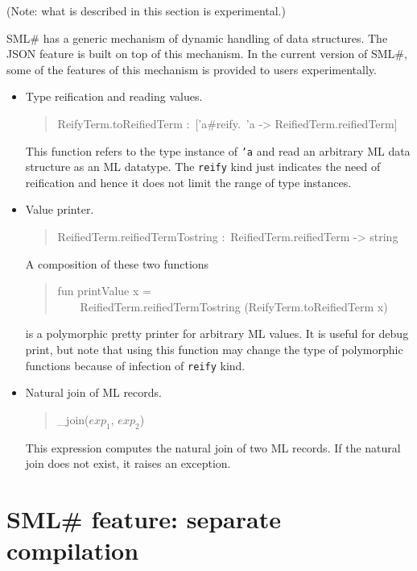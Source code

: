 \documentclass{jbook}
\newcommand{\txt}[2]{#2}
\newcommand{\smlsharp}{SML\#}
\newenvironment{program}{\begin{quote}\begin{tt}}%
                        {\end{tt}\end{quote}}
\begin{document}
\else%
	(Note: what is described in this section is experimental.)

	\smlsharp{} has
a generic mechanism of dynamic handling of data structures.
	The JSON feature is built on top of this mechanism.
	In the current version of \smlsharp{},
some of the features of this mechanism is provided to users
experimentally.

\begin{itemize}
\item
	Type reification and reading values.
\begin{program}
ReifyTerm.toReifiedTerm :\ ['a\#reify.\ 'a -> ReifiedTerm.reifiedTerm]
\end{program}
	This function refers to the type instance of {\tt 'a}
and read an arbitrary ML data structure as an ML datatype.
	The {\tt reify} kind just indicates the need of reification
and hence it does not limit the range of type instances.

\item
	Value printer.
\begin{program}
ReifiedTerm.reifiedTermTostring :\ ReifiedTerm.reifiedTerm -> string
\end{program}

	A composition of these two functions
\begin{program}
fun printValue x =\\
\ \ \ \ ReifiedTerm.reifiedTermTostring (ReifyTerm.toReifiedTerm x)
\end{program}
is a polymorphic pretty printer for arbitrary ML values.
	It is useful for debug print,
but note that
using this function may change the type of polymorphic functions
because of infection of {\tt reify} kind.

\item
        Natural join of ML records.
\begin{program}
\_join($\mathit{exp}_1$, $\mathit{exp}_2$)
\end{program}
	This expression
computes the natural join of two ML records.
	If the natural join does not exist, it raises an exception.

\end{itemize}


\fi%


\chapter{
\txt{\smlsharp{}の拡張機能：\smlsharp{}分割コンパイルシステム}
    {\smlsharp{} feature: separate compilation}
}
\label{chap:tutorialSeparatecompilation}
\end{document}
